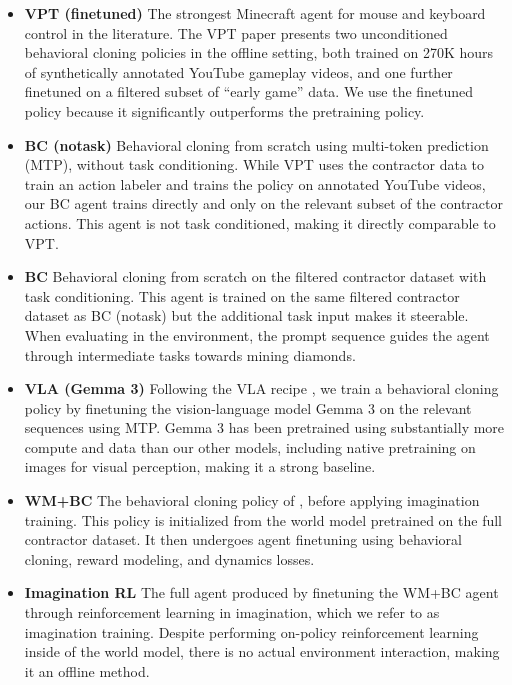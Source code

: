 \documentclass[11pt]{article}
\begin{document}
\begin{itemize}
\item\textbf{VPT (finetuned)}\quad
The strongest Minecraft agent for mouse and keyboard control in the literature\citep{vpt}.
The VPT paper presents two unconditioned behavioral cloning policies in the offline setting, both trained on 270K hours of synthetically annotated YouTube gameplay videos, and one further finetuned on a filtered subset of ``early game'' data.
We use the finetuned policy because it significantly outperforms the pretraining policy.

\item\textbf{BC (notask)}\quad
Behavioral cloning from scratch using multi-token prediction (MTP), without task conditioning.
While VPT uses the contractor data to train an action labeler and trains the policy on annotated YouTube videos, our BC agent trains directly and only on the relevant subset of the contractor actions.
This agent is not task conditioned, making it directly comparable to VPT.

\item\textbf{BC}\quad
Behavioral cloning from scratch on the filtered contractor dataset with task conditioning.
This agent is trained on the same filtered contractor dataset as BC (notask) but the additional task input makes it steerable.
When evaluating in the environment, the prompt sequence guides the agent through intermediate tasks towards mining diamonds.

\item\textbf{VLA (Gemma 3)}\quad
Following the VLA recipe \citep{kim2024openvla,intelligence2025pi05}, we train a behavioral cloning policy by finetuning the vision-language model Gemma 3\citep{team2025gemma3} on the relevant sequences using MTP.
Gemma 3 has been pretrained using substantially more compute and data than our other models, including native pretraining on images for visual perception, making it a strong baseline.

\item\textbf{WM+BC}\quad
The behavioral cloning policy of \method, before applying imagination training.
This policy is initialized from the world model pretrained on the full contractor dataset.
It then undergoes agent finetuning using behavioral cloning, reward modeling, and dynamics losses.

\item\textbf{Imagination RL}\quad
The full \method agent produced by finetuning the WM+BC agent through reinforcement learning in imagination, which we refer to as imagination training.
Despite performing on-policy reinforcement learning inside of the world model, there is no actual environment interaction, making it an offline method.
\end{itemize}
\end{document}

